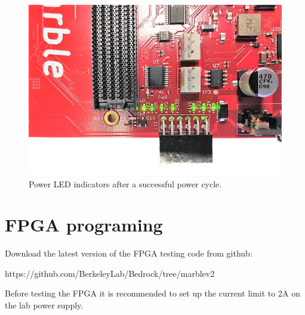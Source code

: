 \documentclass[12pt,oneside,a4]{article}
\begin{document}
\begin{figure}[H]
\begin{center}
\includegraphics[width=0.7\linewidth]{leds.png}
 \caption{Power LED indicators after a successful power cycle.}\label{leds}
\end{center}
\end{figure}

\section{FPGA programing}
Download the latest version of the FPGA testing code from github:
\begin{leftbar}
https://github.com/BerkeleyLab/Bedrock/tree/marblev2
\end{leftbar}

\begin{leftbar}
Before testing the FPGA it is recommended to set up the current limit to 2A on the lab power supply. 
\end{leftbar}
\end{document}
